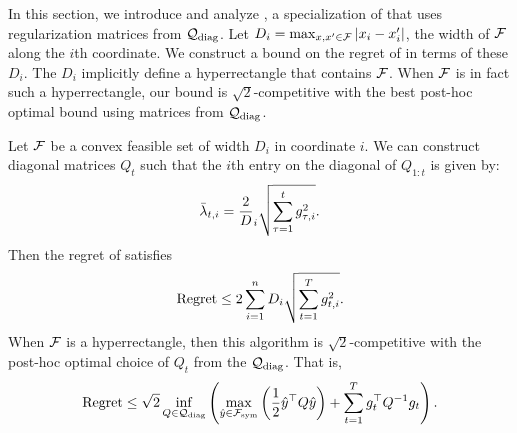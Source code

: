 In this section, we introduce and analyze \FTPRLdiag, a specialization
of \FTPRL that uses regularization matrices from $\mathcal{Q}_{\text{diag}}$.  Let $D_i =
\max_{x, x' \in \mathcal{F}} |x_i - x'_i|$, the width of $\mathcal{F}$ along the
$i$th coordinate.  We construct a bound on the regret of
\FTPRLdiag in terms of these $D_i$.  The $D_i$ implicitly define a
hyperrectangle that contains $\mathcal{F}$.  When $\mathcal{F}$ is in fact such a
hyperrectangle, our bound is $\sqrt{2}$-competitive with the best
post-hoc optimal bound using matrices from $\mathcal{Q}_{\text{diag}}$.

\begin {corollary} \label{cor:percoord}
Let $\mathcal{F}$ be a convex feasible set of width $D_i$ in coordinate $i$.
We can construct diagonal matrices $Q_t$ such that the $i$th entry on
the diagonal of $Q_{1:t}$ is given by:
\[
\bar{\lambda}_{t,i} = \frac 2 D_i {\sqrt {\sum_{\tau=1}^{t} g^2_{\tau, i}}}.
\]
Then the regret of \FTPRL satisfies
\[
  \text{Regret} \leq 2 \sum_{i=1}^n D_i \sqrt{\sum_{t=1}^T g^2_{t, i}}.
\]
When $\mathcal{F}$ is a hyperrectangle, then this algorithm is
$\sqrt{2}$-competitive with the post-hoc optimal choice of $Q_t$ from
the $\mathcal{Q}_{\text{diag}}$. That is,
\[ \text{Regret} \leq \sqrt{2} 
\inf_{Q \in \mathcal{Q}_{\text{diag}}} \left( \max_{\hat{y} \in \mathcal{F}_{\text{sym}}} \left( \frac{1}{2} \hat{y}^\top Q\hat{y} \right)
             + \sum_{t=1}^T g_t^\top Q^{-1}g_t\right).\]


\end {corollary}
